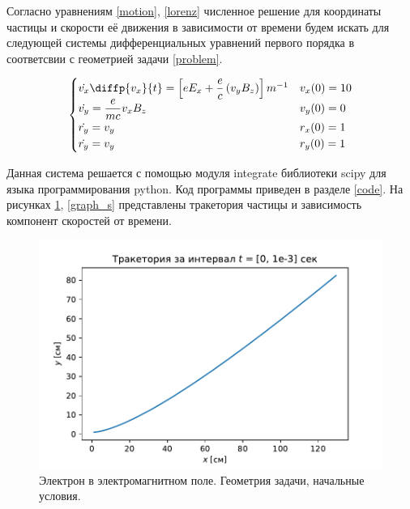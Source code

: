 \documentclass[a4paper]{article}
\begin{document}
Согласно уравнениям \eqref{motion}, \eqref{lorenz} численное решение для координаты частицы и скорости её движения в зависимости от времени будем искать для следующей системы дифференциальных уравнений первого порядка в соответсвии с геометрией задачи \ref{problem}.

\begin{equation}
	\begin{cases}
		\dot{v_x} \diffp{v_x}{t} = \left[eE_x + \dfrac{e}{c}\left(v_yB_z\right)\right]m^{-1}	
											& 	v_x(0) = 10 \\
		\dot{v_y} = \dfrac{e}{mc} v_x B_z	&	v_y(0) = 0 \\
		\dot{r_y} = v_y						&	r_x(0) = 1 \\
		\dot{r_y} = v_y						&	r_y(0) = 1 
	\end{cases}
\end{equation}

Данная система решается с помощью модуля integrate библиотеки scipy для языка программирования python. Код программы приведен в разделе \ref{code}. На рисунках \ref{graph_t}, \ref{graph_s} представлены тракетория частицы и зависимость компонент скоростей от времени. 

\begin{figure}

	\includegraphics[width=\textwidth]{plotTrajectory.pdf}
	\caption{Электрон в электромагнитном поле. Геометрия задачи, начальные условия.}
	\label{graph_t}
\end{figure}
\end{document}
